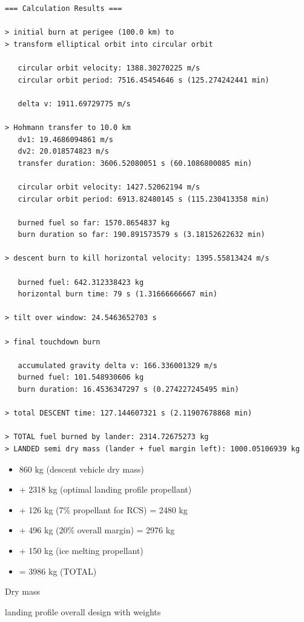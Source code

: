 \begin{lstlisting}[caption={Simulation details from profile (4)}, label=acalcoutput]
=== Calculation Results ===

> initial burn at perigee (100.0 km) to
> transform elliptical orbit into circular orbit

   circular orbit velocity: 1388.30270225 m/s
   circular orbit period: 7516.45454646 s (125.274242441 min)

   delta v: 1911.69729775 m/s

> Hohmann transfer to 10.0 km
   dv1: 19.4686094861 m/s
   dv2: 20.018574823 m/s
   transfer duration: 3606.52080051 s (60.1086800085 min)

   circular orbit velocity: 1427.52062194 m/s
   circular orbit period: 6913.82480145 s (115.230413358 min)

   burned fuel so far: 1570.8654837 kg
   burn duration so far: 190.891573579 s (3.18152622632 min)

> descent burn to kill horizontal velocity: 1395.55813424 m/s

   burned fuel: 642.312338423 kg
   horizontal burn time: 79 s (1.31666666667 min)

> tilt over window: 24.5463652703 s

> final touchdown burn

   accumulated gravity delta v: 166.336001329 m/s
   burned fuel: 101.548930606 kg
   burn duration: 16.4536347297 s (0.274227245495 min)

> total DESCENT time: 127.144607321 s (2.11907678868 min)

> TOTAL fuel burned by lander: 2314.72675273 kg
> LANDED semi dry mass (lander + fuel margin left): 1000.05106939 kg
\end{lstlisting}


\begin{itemize}  
\item 860 kg (descent vehicle dry mass)
\item + 2318 kg (optimal landing profile propellant)
\item + 126 kg (7\% propellant for RCS) = 2480 kg
\item + 496 kg (20\% overall margin) =  2976 kg 
\item + 150 kg (ice melting propellant)
\item = 3986 kg (TOTAL)
\end{itemize}  

Dry mass

landing profile
overall design with weights 
	
